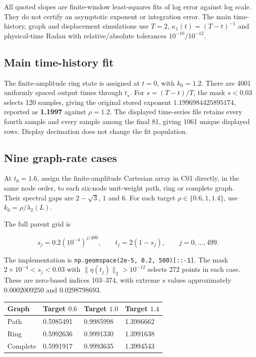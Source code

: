 \documentclass[11pt,a4paper]{article}
\begin{document}
All quoted slopes are finite-window least-squares fits of log error
against log scale. They do not certify an asymptotic exponent or
integration error. The main time-history, graph and displacement
simulations use \(T=2\), \(\kappa_1(t)=(T-t)^{-1}\) and physical-time
Radau with relative/absolute tolerances \(10^{-10}/10^{-12}\).

\subsection{Main time-history fit}\label{c04-main}

The finite-amplitude ring state is assigned at \(t=0\), with
\(k_0=1.2\). There are 4001 uniformly spaced output times through
\(t_\star\). For \(s=(T-t)/T\), the mask \(s<0.03\) selects 120 samples,
giving the original stored exponent \(1.1996984425895174\), reported as
\textbf{1.1997} against \(\rho=1.2\). The displayed time-series file
retains every fourth sample and every sample among the final 81, giving
1061 unique displayed rows. Display decimation does not change the fit
population.

\subsection{Nine graph-rate cases}\label{c04-graphs}

At \(t_0=1.6\), assign the finite-amplitude Cartesian array in C01
directly, in the same node order, to each six-node unit-weight path,
ring or complete graph. Their spectral gaps are \(2-\sqrt3\), \(1\) and
\(6\). For each target \(\rho\in\{0.6,1,1.4\}\), use
\(k_0=\rho/\lambda_2(L)\).

The full parent grid is

\[
s_j=0.2(10^{-4})^{j/499},\qquad t_j=2(1-s_j),\qquad j=0,\ldots,499. \tag{E04}
\]

The implementation is \texttt{np.geomspace(2e-5,\ 0.2,\ 500){[}::-1{]}}.
The mask \(2\times10^{-4}<s_j<0.03\) with \(\|\eta(t_j)\|_2>10^{-12}\)
selects 272 points in each case. These are zero-based indices 103--374,
with extreme \(s\) values approximately \(0.0002009250\) and
\(0.0298798693\).

\begin{longtable}[]{@{}llll@{}}
\toprule\noalign{}
Graph & Target \(0.6\) & Target \(1.0\) & Target \(1.4\) \\
\midrule\noalign{}
\endhead
\bottomrule\noalign{}
\endlastfoot
Path & 0.5985491 & 0.9985998 & 1.3986662 \\
Ring & 0.5992636 & 0.9991330 & 1.3991638 \\
Complete & 0.5991917 & 0.9993635 & 1.3994543 \\
\end{longtable}
\end{document}
